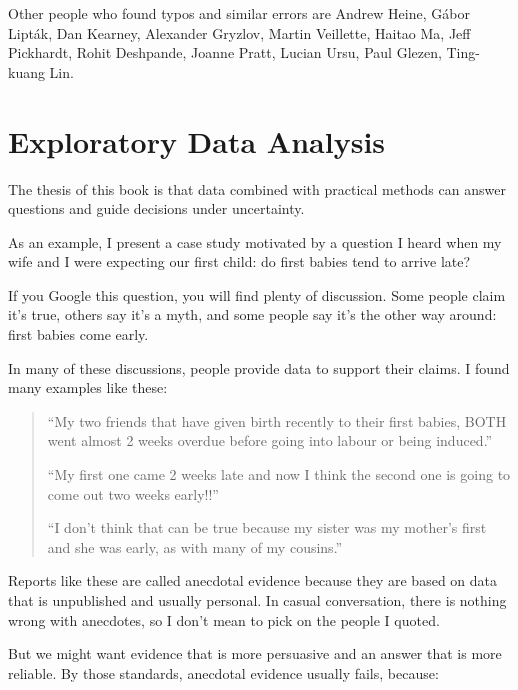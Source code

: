 \documentclass[]{book}
\begin{document}
Other people who found typos and similar
errors are Andrew Heine, Gábor Lipták, Dan Kearney, Alexander Gryzlov,
Martin Veillette, Haitao Ma, Jeff Pickhardt, Rohit Deshpande, Joanne
Pratt, Lucian Ursu, Paul Glezen, Ting-kuang Lin.

\hypertarget{exploratory}{%
\chapter{Exploratory Data Analysis}\label{exploratory}}

The thesis of this book is that data
combined with practical methods can answer questions and guide decisions
under uncertainty.

As an example, I present a case study
motivated by a question I heard when my wife and I were expecting our
first child: do first babies tend to arrive late?

If you Google this question, you will
find plenty of discussion. Some people claim it's true, others say it's
a myth, and some people say it's the other way around: first babies come
early.

In many of these discussions, people
provide data to support their claims. I found many examples like
these:

\begin{quote}
``My two friends that have given birth
recently to their first babies, BOTH went almost 2 weeks overdue
before going into labour or being induced.''

``My first one came 2 weeks late and now
I think the second one is going to come out two weeks early!!''

``I don't think that can be true because
my sister was my mother's first and she was early, as with many of my
cousins.''
\end{quote}

Reports like these are called anecdotal evidence because they are
based on data that is unpublished and usually personal. In casual
conversation, there is nothing wrong with anecdotes, so I don't mean to
pick on the people I quoted.

But we might want evidence that is more
persuasive and an answer that is more reliable. By those standards,
anecdotal evidence usually fails, because:
\end{document}

